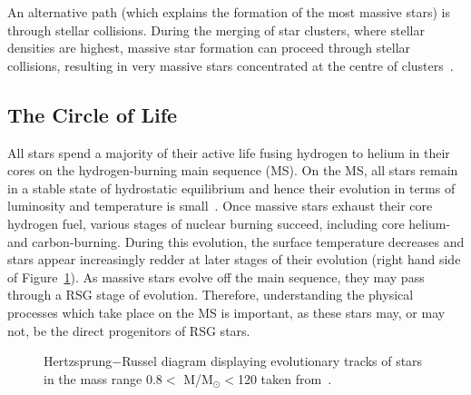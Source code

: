 An alternative path (which explains the formation of the most massive stars) is through stellar collisions.
During the merging of star clusters, where stellar densities are highest, massive star formation can proceed through stellar collisions, resulting in very massive stars concentrated at the centre of clusters~\citep{Fujii13}.



\subsection{The Circle of Life} %
\label{sub:life_cycle}


All stars spend a majority of their active life fusing hydrogen to helium in their cores on the hydrogen-burning main sequence (MS).
On the MS, all stars remain in a stable state of hydrostatic equilibrium and hence their evolution in terms of luminosity and temperature is small~\citep{b:KippenhahnWeigert}.
Once massive stars exhaust their core hydrogen fuel, various stages of nuclear burning succeed, including core helium- and carbon-burning.
During this evolution, the surface temperature decreases and stars appear increasingly redder at later stages of their evolution (right hand side of Figure~\ref{HRD}).
As massive stars evolve off the main sequence, they may pass through a RSG stage of evolution.
Therefore, understanding the physical processes which take place on the MS is important, as these stars may, or may not, be the direct progenitors of RSG stars.
\begin{figure}[t]
  \begin{center}
  \epsfxsize=100mm         %
  \caption{Hertzsprung$-$Russel diagram displaying evolutionary tracks of stars in the mass range 0.8$<$ M/M$_{\odot}$$<$120 taken from~\cite{Ekstrom12}.}
    \label{HRD}
    \end{center}
 \end{figure}

